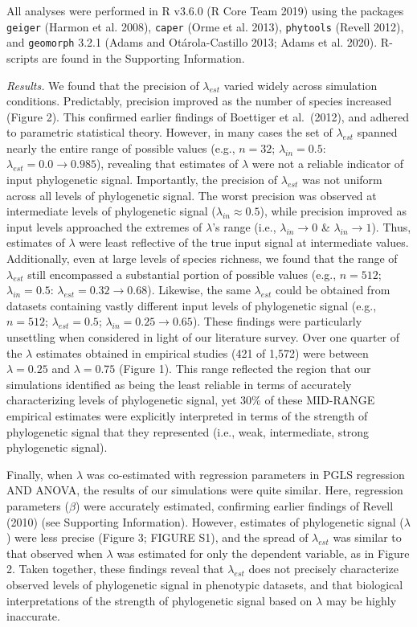 \documentclass[
]{article}
\begin{document}
All analyses were performed in R v3.6.0 (R Core Team 2019) using the
packages \texttt{geiger} (Harmon et al. 2008), \texttt{caper} (Orme et
al. 2013), \texttt{phytools} (Revell 2012), and \texttt{geomorph} 3.2.1
(Adams and Otárola-Castillo 2013; Adams et al. 2020). R-scripts are
found in the Supporting Information. \hfill\break

\emph{Results.} We found that the precision of \(\lambda_{est}\) varied
widely across simulation conditions. Predictably, precision improved as
the number of species increased (Figure 2). This confirmed earlier
findings of Boettiger et al.~(2012), and adhered to parametric
statistical theory. However, in many cases the set of \(\lambda_{est}\)
spanned nearly the entire range of possible values (e.g., \(n=32\);
\(\lambda_{in}=0.5\): \(\lambda_{est}= 0.0\to 0.985\)), revealing that
estimates of \(\lambda\) were not a reliable indicator of input
phylogenetic signal. Importantly, the precision of \(\lambda_{est}\) was
not uniform across all levels of phylogenetic signal. The worst
precision was observed at intermediate levels of phylogenetic signal
(\(\lambda_{in}\approx0.5\)), while precision improved as input levels
approached the extremes of \(\lambda\)'s range (i.e.,
\(\lambda_{in}\rightarrow0\) \& \(\lambda_{in}\rightarrow1\)). Thus,
estimates of \(\lambda\) were least reflective of the true input signal
at intermediate values. Additionally, even at large levels of species
richness, we found that the range of \(\lambda_{est}\) still encompassed
a substantial portion of possible values (e.g., \(n=512\);
\(\lambda_{in}=0.5\): \(\lambda_{est} = 0.32\to 0.68\)). Likewise, the
same \(\lambda_{est}\) could be obtained from datasets containing vastly
different input levels of phylogenetic signal (e.g., \(n=512\);
\(\lambda_{est} = 0.5\); \(\lambda_{in} = 0.25 \to 0.65\)). These
findings were particularly unsettling when considered in light of our
literature survey. Over one quarter of the \(\lambda\) estimates
obtained in empirical studies (421 of 1,572) were between
\(\lambda=0.25\) and \(\lambda=0.75\) (Figure 1). This range reflected
the region that our simulations identified as being the least reliable
in terms of accurately characterizing levels of phylogenetic signal, yet
30\% of these MID-RANGE empirical estimates were explicitly interpreted
in terms of the strength of phylogenetic signal that they represented
(i.e., weak, intermediate, strong phylogenetic signal). \hfill\break

Finally, when \(\lambda\) was co-estimated with regression parameters in
PGLS regression AND ANOVA, the results of our simulations were quite
similar. Here, regression parameters (\(\beta\)) were accurately
estimated, confirming earlier findings of Revell (2010) (see Supporting
Information). However, estimates of phylogenetic signal (\(\lambda\))
were less precise (Figure 3; FIGURE S1), and the spread of
\(\lambda_{est}\) was similar to that observed when \(\lambda\) was
estimated for only the dependent variable, as in Figure 2. Taken
together, these findings reveal that \(\lambda_{est}\) does not
precisely characterize observed levels of phylogenetic signal in
phenotypic datasets, and that biological interpretations of the strength
of phylogenetic signal based on \(\lambda\) may be highly inaccurate.
\hfill\break
\end{document}
